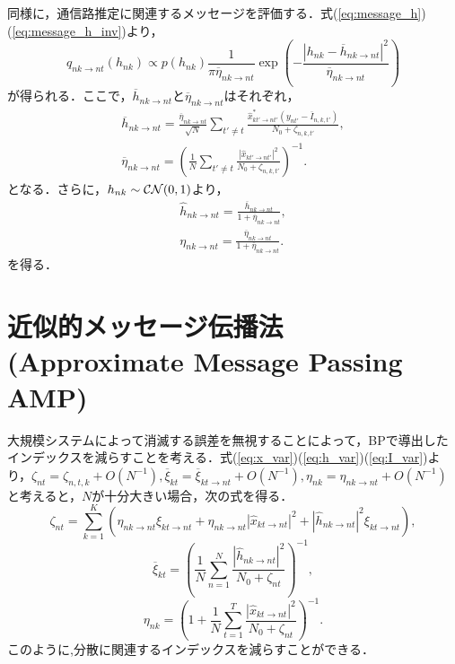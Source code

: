 同様に，通信路推定に関連するメッセージを評価する．式(\ref{eq:message_h})(\ref{eq:message_h_inv})より，
\begin{equation}
	q_{nk\to nt}(h_{nk}) \propto 
		p(h_{nk})
		\frac{1}{\pi \overline{\eta}_{nk\to nt}}
		\exp
			\left(
				-\frac{|h_{nk}-\overline{h}_{nk\to nt}|^2}{\overline{\eta}_{nk\to nt}}
			\right)
\end{equation}
が得られる．ここで，$\overline{h}_{nk\to nt}$と$\overline{\eta}_{nk\to nt}$はそれぞれ，
\begin{eqnarray}
	\overline{h}_{nk\to nt} = 
		\frac{\overline{\eta}_{nk\to nt}}{\sqrt{N}}
		\sum_{t'\neq t}
			\frac{\hat{x}^{*}_{kt' \to nt'}(y_{nt'}-\overline{I}_{n,k,t'})}{N_0 + \zeta_{n,k,t'}},\\
	\overline{\eta}_{nk\to nt} = 
		\left(
			\frac{1}{N}	
			\sum_{t'\neq t}
				\frac{|\hat{x}_{kt' \to nt'}|^2}{N_{0}+\zeta_{n,k,t'}}	
		\right)^{-1}.
\end{eqnarray}
となる．さらに，$h_{nk}\sim{\cal CN}(0,1)$より，
\begin{eqnarray}
	\hat{h}_{nk \to nt} = 
		\frac{\overline{h}_{nk\to nt}}{1+\overline{\eta}_{nk\to nt}},\\
	\eta_{nk\to nt} =
		\frac{\overline{\eta}_{nk\to nt}}{1+\overline{\eta}_{nk\to nt}}.
\end{eqnarray}
を得る．

\section{近似的メッセージ伝播法 (Approximate Message Passing AMP)}
大規模システムによって消滅する誤差を無視することによって，BPで導出したインデックスを減らすことを考える．式(\ref{eq:x_var})(\ref{eq:h_var})(\ref{eq:I_var})より，$\zeta_{nt}=\zeta_{n,t,k}+O(N^{-1}),\overline{\xi}_{kt}=\overline{\xi}_{kt \to nt}+O(N^{-1}),\eta_{nk}=\eta_{nk \to nt}+O(N^{-1})$と考えると，$N$が十分大きい場合，次の式を得る．
\begin{equation}
	\label{eq:zeta_before}
	\zeta_{nt}=
	\sum_{k=1}^{K}
		\left(
			\eta_{nk\to nt}\xi_{kt\to nt}
			+
			\eta_{nk\to nt}|\hat{x}_{kt\to nt}|^{2}
			+
			|\hat{h}_{nk\to nt}|^{2}\xi_{kt\to nt}
		\right),
\end{equation}
\begin{equation}
	\label{eq:xi_before}
	\overline{\xi}_{kt}=
	\left(
		\frac{1}{N}
		\sum_{n=1}^N
			\frac
			{|\hat{h}_{nk\to nt}|^{2}}
			{N_{0}+\zeta_{nt}}
	\right)^{-1},
\end{equation}
\begin{equation}
	\label{eq:eta_before}
	\eta_{nk}=
		\left(
			1+
			\frac{1}{N}
			\sum_{t=1}^T
				\frac
				{|\hat{x}_{kt\to nt}|^{2}}
				{N_{0}+\zeta_{nt}}
		\right)^{-1}.
\end{equation}
このように,分散に関連するインデックスを減らすことができる．

